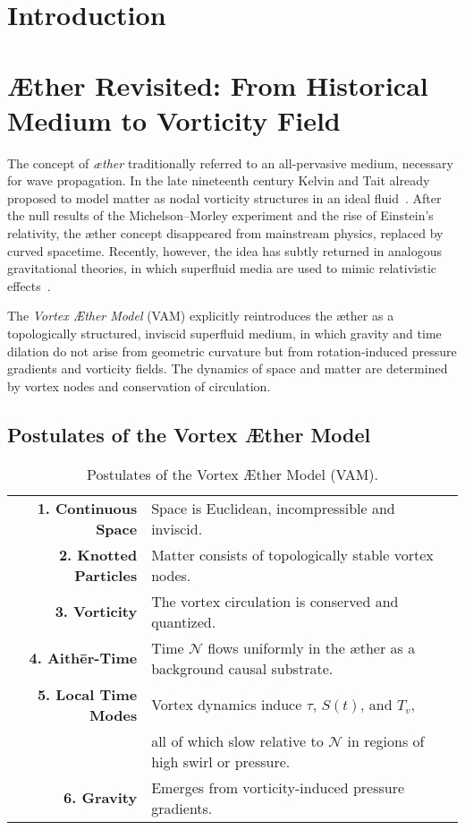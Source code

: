 \section*{Introduction}
\section*{Æther Revisited: From Historical Medium to Vorticity Field}

The concept of \textit{æther} traditionally referred to an all-pervasive medium, necessary for wave propagation. In the late nineteenth century Kelvin and Tait already proposed to model matter as nodal vorticity structures in an ideal fluid~\cite{thomson1867treatise}. After the null results of the Michelson--Morley experiment and the rise of Einstein's relativity, the æther concept disappeared from mainstream physics, replaced by curved spacetime. Recently, however, the idea has subtly returned in analogous gravitational theories, in which superfluid media are used to mimic relativistic effects~\cite{barcelo2011analogue,volovik2009universe}.

The \textit{Vortex Æther Model} (VAM) explicitly reintroduces the æther as a topologically structured, inviscid superfluid medium, in which gravity and time dilation do not arise from geometric curvature but from rotation-induced pressure gradients and vorticity fields. The dynamics of space and matter are determined by vortex nodes and conservation of circulation.

\subsection*{Postulates of the Vortex Æther Model}

\begin{table}[h!]
    \centering
    \begin{tabular}{rl}
        \midrule
        \hline
        \textbf{1. Continuous Space} & Space is Euclidean, incompressible and inviscid. \\
        \textbf{2. Knotted Particles} & Matter consists of topologically stable vortex nodes. \\
        \textbf{3. Vorticity} & The vortex circulation is conserved and quantized. \\
        \textbf{4. Aithēr-Time} & Time $\mathcal{N}$ flows uniformly in the æther as a background causal substrate. \\
        \textbf{5. Local Time Modes} & Vortex dynamics induce $\tau$, $S(t)$, and $T_v$,\\ & all of which slow relative to $\mathcal{N}$ in regions of high swirl or pressure. \\
        \textbf{6. Gravity} & Emerges from vorticity-induced pressure gradients. \\
        \hline
        \bottomrule
    \end{tabular}
    \caption{Postulates of the Vortex Æther Model (VAM).}
    \label{tab:postulates}
\end{table}

